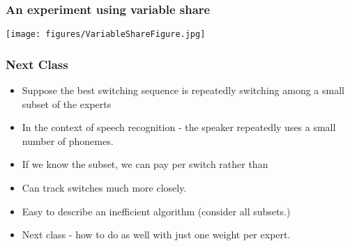 \documentclass[handout]{beamer}
\begin{document}
\begin{frame}
\frametitle{An experiment using variable share}
\texttt{[image: figures/VariableShareFigure.jpg]}
\end{frame}

\begin{frame}
\frametitle{Next Class}
\begin{itemize}
\item Suppose the best switching sequence is repeatedly switching among a small subset of the experts
\item In the context of speech recognition - the speaker repeatedly uses a small number of phonemes.
\item If we know the subset, we can pay  per switch rather than 
\item Can track switches much more closely.
\item Easy to describe an inefficient algorithm (consider all  subsets.)
\item Next class - how to do as well with just one weight per expert.
\end{itemize}
\end{frame}

\iffalse %

\fi %
\end{document}
